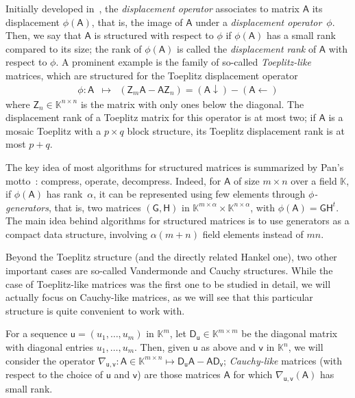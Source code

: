 \documentclass{sig-alternate}
\newcommand{\vu}{\ensuremath{\mathsf{u}}}
\newcommand{\vv}{\ensuremath{\mathsf{v}}}
\newcommand{\mA}{\ensuremath{\mathsf{A}}}
\newcommand{\mD}{\ensuremath{\mathsf{D}}}
\newcommand{\mG}{\ensuremath{\mathsf{G}}}
\newcommand{\mH}{\ensuremath{\mathsf{H}}}
\newcommand{\mZ}{\ensuremath{\mathsf{Z}}}
\newcommand{\K}{\ensuremath{\mathbb{K}}}
\begin{document}
\smallskip{}  Initially developed
in~\cite{KaKuMo79}, the {\it displacement operator} associates to
matrix $\mA$ its displacement $\phi(\mA)$, that is, the image of $\mA$
under a \textit{displacement operator}~$\phi$.  Then, we say that
$\mA$ is structured with respect to $\phi$ if $\phi(\mA)$ has a small
rank compared to its size; the rank of $\phi(\mA)$ is called the
\textit{displacement rank} of $\mA$ with respect to $\phi$. A
prominent example is the family of so-called {\em Toeplitz-like}
matrices, which are structured for the Toeplitz displacement operator
\begin{eqnarray*}
  \phi: \mA & \mapsto & \left( \mZ_m \mA - \mA \mZ_n \right) = 
                        (\mA \downarrow) - (\mA \leftarrow)
\end{eqnarray*}
where $\mZ_n \in \K^{n \times n}$ is the matrix with only ones below the
diagonal.  The displacement rank of a Toeplitz matrix for this operator is at
most two; if $\mA$ is a mosaic Toeplitz with a $p \times q$ block structure, its
Toeplitz displacement rank is at most $p+q$.

The key idea of most algorithms for structured matrices is summarized
by Pan's motto~\cite{Pan01}: compress, operate, decompress. Indeed,
for $\mA$ of size $m \times n$ over a field $\K$, if $\phi(\mA)$ has
rank~$\alpha$, it can be represented using few elements through {\it
  $\phi$-generators}, that is, two matrices $(\mG,\mH)$ in $\K^{m\times
  \alpha} \times \K^{n\times \alpha}$, with $\phi(\mA) = \mG \mH^t$.
The main idea behind algorithms for structured matrices is to use 
generators as a compact data structure, involving $\alpha (m+n)$ field
elements instead of $mn$. 

\smallskip{}  Beyond the Toeplitz
structure (and the directly related Hankel one), two other important
cases are so-called Vandermonde and Cauchy structures. While the case
of Toeplitz-like matrices was the first one to be studied in detail,
we will actually focus on Cauchy-like matrices, as we will see that
this particular structure is quite convenient to work with.

For a sequence $\vu=(u_1,\dots,u_m)$ in $\K^m$, let $\mD_\vu \in
\K^{m\times m}$ be the diagonal matrix with diagonal entries
$u_1,\dots,u_m$. Then, given $\vu$ as above and $\vv$ in $\K^n$, we will
consider the operator $\nabla_{\vu,\vv}: \mA \in \K^{m\times n} \mapsto \mD_\vu
\mA - \mA \mD_\vv$; {\em Cauchy-like} matrices (with respect to the
choice of $\vu$ and $\vv$) are those matrices $\mA$ for which
$\nabla_{\vu,\vv}(\mA)$ has small rank.
\end{document}

